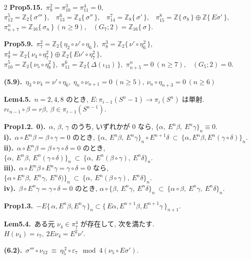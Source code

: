\documentclass[10pt, leqno]{ltjsarticle}
\newcommand{\Ex}{E}        %
\newcommand{\todai}[2][]{\{\,#2\,\}_{#1}}      %
\newcommand{\gen}[1]{\{\,#1\,\}}       %
\newcommand{\pis}[2]{\pi_{#1}(#2)}       %
\numberwithin{equation}{section}
\theoremstyle{plain}
\theoremstyle{definition}
\theoremstyle{remark}
\begin{document}
\begin{paracol}{2}
\noindent
\textbf{Prop5.15.}\
\(\pi_9^2=\pi_{10}^3=\pi_{11}^4=0,\) \\
\(\pi^{5}_{12}=\mathbb Z_2\gen{\sigma'''},\) \
\(\pi^{6}_{13}=\mathbb Z_4\gen{\sigma''},\) \
\(\pi^{7}_{14}=\mathbb Z_8\gen{\sigma'},\) \
\(\pi^{8}_{15}=\mathbb Z\gen{\sigma_8}\oplus\mathbb Z\gen{E\sigma'},\) \\
\(\pi^{n}_{n+7}=\mathbb Z_{16}\gen{\sigma_n}\ (n\ge9),\) \
\((G_{7};2)=\mathbb Z_{16}\gen{\sigma}.\)

\noindent
\textbf{Prop5.9.}\
\(\pi^{2}_{7}=\mathbb Z_2\gen{\eta_{2}\circ\nu'\circ\eta_6},\) \quad
\(\pi^{3}_{8}=\mathbb Z_2\gen{\nu'\circ\eta_6^2},\) \quad
\(\pi^{4}_{9}=\mathbb Z_2\gen{\nu_{4}\circ\eta_7^2}\oplus \mathbb Z_2\gen{E\nu'\circ\eta_7^2},\) \\
\(\pi^{5}_{10}=\mathbb Z_2\gen{\nu_{5}\circ\eta_8^2},\) \quad
\(\pi^{6}_{11}=\mathbb Z_2\gen{\Delta(\iota_{13})},\) \quad
\(\pi^{n}_{n+5}=0\ (n\ge7),\) \
\((G_{5};2)=0.\)

\noindent
\textbf{(5.9).}\
\(\eta_3\circ \nu_4= \nu'\circ \eta_6,\
\eta_n\circ \nu_{n+1}=0\ (n\ge5),\
\nu_n\circ \eta_{n+3}=0\ (n\ge6)\)

\noindent
\textbf{Lem4.5.}\
\(n=2,4,8\) のとき, 
\(E:\pis{i-1}{S^n-1}\to\pis{i}{S^n}\) は単射.\\ 
\(r\iota_{n-1}\circ\beta = r\beta,\ \beta\in\pis{i-1}{S^{n-1}}\).

\noindent
\textbf{Prop1.2.}\
\textbf{0).}\ $\alpha$, $\beta$, $\gamma$ のうち, いずれかが $0$ なら,
\(
\{\alpha,\ \Ex^n\beta,\ \Ex^n\gamma\}_n\equiv0.
\)\\
\textbf{i).}\ $\alpha\circ \Ex^n\beta=\beta\circ\gamma=0$ のとき,
\(
\{\alpha,\ \Ex^n\beta,\ \Ex^n\gamma\}_n\circ\Ex^{n+1}\delta\ \subset\ \{\alpha,\Ex^n \beta, \Ex^n(\gamma\circ\delta)\}_n.
\)\\
\textbf{ii).}\ $\alpha\circ \Ex^n\beta=\beta\circ\gamma\circ\delta=0$ のとき,
\(
\{\alpha,\ \Ex^n\beta,\ \Ex^n(\gamma\circ\delta)\}_n\ \subset\ \{\alpha,\ \Ex^n(\beta\circ\gamma),\ \Ex^n\delta\}_n .
\)\\
\textbf{iii).}\ $\alpha\circ\Ex^n\beta\circ\Ex^n\gamma=\gamma\circ\delta=0$ なら,
\(
\{\alpha\circ\Ex^n\beta,\ \Ex^n\gamma,\ \Ex^n\delta)\}_n\ \subset\ \{\alpha,\ \Ex^n(\beta\circ\gamma),\ \Ex^n\delta\}_n .
\)\\
\textbf{iv).}\ $\beta\circ\Ex^n\gamma=\gamma\circ\delta=0$ のとき,
\(
\alpha\circ\{\beta,\ \Ex^n\gamma,\ \Ex^n\delta\}_n\ \subset\ \{\alpha\circ\beta,\ \Ex^n\gamma,\ \Ex^n\delta\}_n .
\)

\noindent
\textbf{Prop1.3.}\
\(-E\todai[n]{\alpha, E^n\beta, E^n\gamma}
\subset \todai[n+1]{E\alpha, E^{n+1}\beta, E^{n+1}\gamma}\).

\noindent
\textbf{Lem5.4.}\
ある元 \(\nu_{4}\in \pi^{4}_{7}\) が存在して, 次を満たす. \\
\(H(\nu_{4})=\iota_7,\ 2E \nu_{4}=E^{2}\nu' .\)

\noindent
\textbf{(6.2).}\ 
\(\sigma'''\circ \nu_{12}\ \equiv\ \eta_5^{\,2}\circ \varepsilon_7
\mod{4(\nu_5\circ E\sigma')} .\)







\end{paracol}
\end{document}
